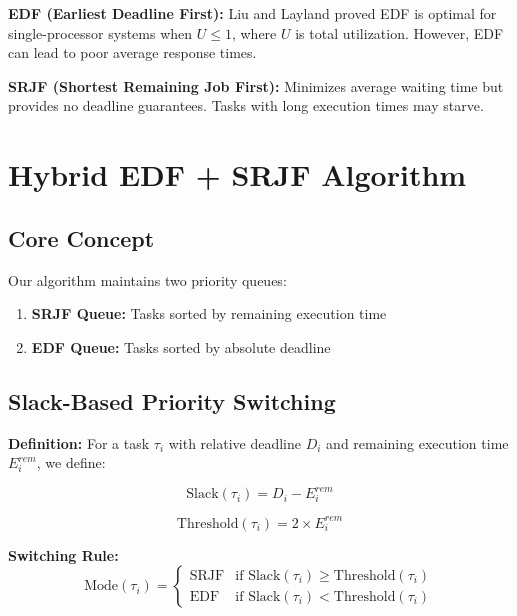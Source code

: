 \documentclass[conference]{IEEEtran}
\begin{document}
\textbf{EDF (Earliest Deadline First):} Liu and Layland \cite{liu1973} proved EDF is optimal for single-processor systems when $U \leq 1$, where $U$ is total utilization. However, EDF can lead to poor average response times.

\textbf{SRJF (Shortest Remaining Job First):} Minimizes average waiting time but provides no deadline guarantees. Tasks with long execution times may starve.

\section{Hybrid EDF + SRJF Algorithm}

\subsection{Core Concept}

Our algorithm maintains two priority queues:
\begin{enumerate}
    \item \textbf{SRJF Queue:} Tasks sorted by remaining execution time
    \item \textbf{EDF Queue:} Tasks sorted by absolute deadline
\end{enumerate}

\subsection{Slack-Based Priority Switching}

\textbf{Definition:} For a task $\tau_i$ with relative deadline $D_i$ and remaining execution time $E_i^{rem}$, we define:

\begin{equation}
\text{Slack}({\tau_i}) = D_i - E_i^{rem}
\end{equation}

\begin{equation}
\text{Threshold}({\tau_i}) = 2 \times E_i^{rem}
\end{equation}

\textbf{Switching Rule:}
\begin{equation}
\text{Mode}({\tau_i}) =
\begin{cases}
\text{SRJF} & \text{if Slack}(\tau_i) \geq \text{Threshold}(\tau_i) \\
\text{EDF} & \text{if Slack}(\tau_i) < \text{Threshold}(\tau_i)
\end{cases}
\end{equation}
\end{document}
